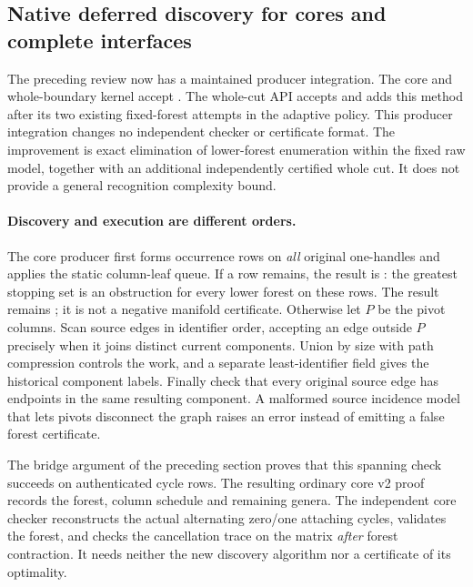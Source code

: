 \subsection{Native deferred discovery for cores and complete interfaces}
\label{marked-cut:deferred-native}

The preceding review now has a maintained producer integration. The core
and whole-boundary kernel accept . The whole-cut API
accepts  and adds this method after its two
existing fixed-forest attempts in the adaptive policy. This producer
integration changes no independent checker or certificate format. The improvement is
exact elimination of lower-forest enumeration within the fixed raw model,
together with an additional independently certified whole cut. It does
not provide a general recognition complexity bound.

\paragraph{Discovery and execution are different orders.}
The core producer first forms occurrence rows on \emph{all} original
one-handles and applies the static column-leaf queue. If a row remains,
the result is : the greatest
stopping set is an obstruction for every lower forest on these rows.
The result remains ; it is not a negative manifold
certificate. Otherwise let $P$ be the pivot columns. Scan source edges in
identifier order, accepting an edge outside $P$ precisely when it joins
distinct current components. Union by size with path compression controls
the work, and a separate least-identifier field gives the historical
component labels. Finally check that every original source edge has
endpoints in the same resulting component. A malformed source incidence
model that lets pivots disconnect the graph raises an error instead of
emitting a false forest certificate.

The bridge argument of the preceding section proves that this spanning
check succeeds on authenticated cycle rows. The resulting ordinary core
v2 proof records the forest, column schedule and remaining genera. The
independent core checker reconstructs the actual alternating zero/one
attaching cycles, validates the forest, and checks the cancellation trace
on the matrix \emph{after} forest contraction. It needs neither the new
discovery algorithm nor a certificate of its optimality.

